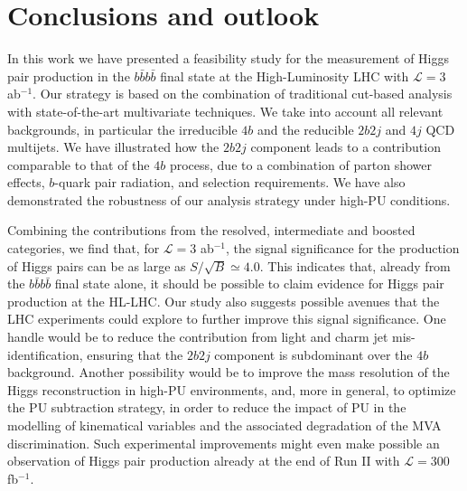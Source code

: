 \section{Conclusions and outlook}
\label{sec:conclusions}

In this work we have presented a feasibility study for
 the measurement of Higgs pair production in the $b\bar{b}b\bar{b}$
final state at the High-Luminosity LHC with $\mathcal{L}=3$ ab$^{-1}$.
%
Our strategy is based on the combination of traditional
cut-based analysis with state-of-the-art multivariate techniques.
%
We take into account 
all relevant backgrounds, in particular
the irreducible $4b$
and the reducible 
$2b2j$ and $4j$ QCD multijets.
%
We have illustrated how the $2b2j$ component leads to
a contribution comparable to that of the $4b$ process,
due to a combination of  parton shower effects, $b$-quark 
pair radiation, and selection requirements.
%
We have also demonstrated the robustness of our analysis strategy
under high-PU conditions.

Combining the contributions from the resolved,
intermediate and boosted categories, we find that, for
$\mathcal{L}=3$ ab$^{-1}$, the
signal significance for
the production of Higgs pairs can be as large as $S/\sqrt{B}\simeq 4.0$.
%
This indicates that, already from the $b\bar{b}b\bar{b}$
final state alone,
it should be possible to claim evidence for Higgs pair production at
the HL-LHC.
%
Our study also suggests possible avenues that the LHC experiments
could explore to further improve this signal significance.
%
One handle would be to reduce the contribution from light and charm
jet mis-identification, ensuring that the
$2b2j$ component is subdominant over the $4b$ background.
%
Another possibility would be to improve the mass resolution of the Higgs
reconstruction
in high-PU environments, and, more in general,
to optimize the PU subtraction
strategy, in order
to reduce the impact of PU in the modelling
of kinematical variables and the associated
degradation of the MVA discrimination.
%
Such experimental improvements might
even make possible
an observation of Higgs pair production already at the
end of Run II with
$\mathcal{L}=300$ fb$^{-1}$.

